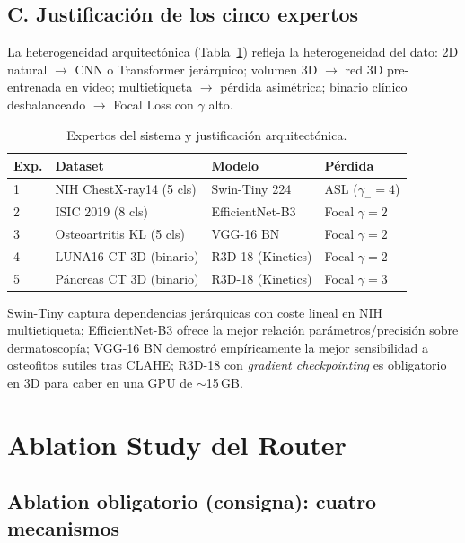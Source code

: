 \documentclass[conference]{IEEEtran}
\begin{document}
\subsection*{C. Justificación de los cinco expertos}
La heterogeneidad arquitectónica (Tabla~\ref{tab:expertos_arq}) refleja la heterogeneidad del dato: 2D natural $\to$ CNN o Transformer jerárquico; volumen 3D $\to$ red 3D pre-entrenada en video; multietiqueta $\to$ pérdida asimétrica; binario clínico desbalanceado $\to$ Focal Loss con $\gamma$ alto.

\begin{table}[H]
\centering
\caption{Expertos del sistema y justificación arquitectónica.}
\label{tab:expertos_arq}
\begin{tabular}{@{}llll@{}}
\toprule
\textbf{Exp.} & \textbf{Dataset} & \textbf{Modelo} & \textbf{Pérdida} \\ \midrule
1 & NIH ChestX-ray14 (5 cls) & Swin-Tiny 224 & ASL ($\gamma_-{=}4$) \\
2 & ISIC 2019 (8 cls) & EfficientNet-B3 & Focal $\gamma{=}2$ \\
3 & Osteoartritis KL (5 cls) & VGG-16 BN & Focal $\gamma{=}2$ \\
4 & LUNA16 CT 3D (binario) & R3D-18 (Kinetics) & Focal $\gamma{=}2$ \\
5 & Páncreas CT 3D (binario) & R3D-18 (Kinetics) & Focal $\gamma{=}3$ \\ \bottomrule
\end{tabular}
\end{table}

Swin-Tiny captura dependencias jerárquicas con coste lineal en NIH multietiqueta; EfficientNet-B3 ofrece la mejor relación parámetros/precisión sobre dermatoscopía; VGG-16 BN demostró empíricamente la mejor sensibilidad a osteofitos sutiles tras CLAHE; R3D-18 con \textit{gradient checkpointing} es obligatorio en 3D para caber en una GPU de $\sim$15\,GB.

\section{Ablation Study del Router}

\subsection{Ablation obligatorio (consigna): cuatro mecanismos}
\end{document}
